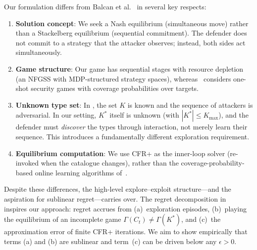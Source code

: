 \documentclass[sigconf]{aamas}
\newcommand{\Kmax}{K_{\max}}
\begin{document}
Our formulation differs from Balcan et al.~\cite{Balcan2015} in several key respects:
\begin{enumerate}
    \item \textbf{Solution concept}: We seek a Nash equilibrium (simultaneous move) rather than a Stackelberg equilibrium (sequential commitment). The defender does not commit to a strategy that the attacker observes; instead, both sides act simultaneously.
    \item \textbf{Game structure}: Our game has sequential stages with resource depletion (an NFGSS with MDP-structured strategy spaces), whereas~\cite{Balcan2015} considers one-shot security games with coverage probabilities over targets.
    \item \textbf{Unknown type set}: In \cite{Balcan2015}, the set $K$ is known and the sequence of attackers is adversarial. In our setting, $K^*$ itself is unknown (with $|K^*| \leq \Kmax$), and the defender must \emph{discover} the types through interaction, not merely learn their sequence. This introduces a fundamentally different exploration requirement.
    \item \textbf{Equilibrium computation}: We use CFR+ as the inner-loop solver (re-invoked when the catalogue changes), rather than the coverage-probability-based online learning algorithms of~\cite{Balcan2015}.
\end{enumerate}

Despite these differences, the high-level explore--exploit structure---and the aspiration for sublinear regret---carries over. The regret decomposition in~\cite{Balcan2015} inspires our approach: regret accrues from (a)~exploration episodes, (b)~playing the equilibrium of an incomplete game $\Gamma(C_t) \neq \Gamma(K^*)$, and (c)~the approximation error of finite CFR+ iterations. We aim to show empirically that terms (a) and (b) are sublinear and term~(c) can be driven below any $\epsilon > 0$.


\end{document}
